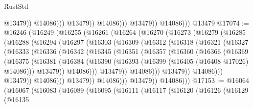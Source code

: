 \begin{lexlean}{RustStd}
\begin{coremodule}
                                  @13479))
                              @14086)))
                        @13479))
                    @14086)))
              @13479))
          @14086)))
    @13479
@17074 := @16246
    (@16249
      (@16255
        (@16261
          (@16264
            (@16270
              (@16273
                (@16279
                  (@16285
                    (@16288
                      (@16294
                        (@16297
                          (@16303
                            (@16309
                              (@16312
                                (@16318
                                  (@16321
                                    (@16327
                                      (@16333
                                        (@16336
                                          (@16342
                                            (@16345
                                              (@16351
                                                (@16357
                                                  (@16360
                                                    (@16366
                                                      (@16369
                                                        (@16375
                                                          (@16381
                                                            (@16384
                                                              (@16390
                                                                (@16393
                                                                  (@16399
                                                                    (@16405
                                                                      (@16408 @17026)
                                                                      @14086)))
                                                                @13479))
                                                            @14086)))
                                                      @13479))
                                                  @14086)))
                                            @13479))
                                        @14086)))
                                  @13479))
                              @14086)))
                        @13479))
                    @14086)))
              @13479))
          @14086)))
@17153 := @16064
    (@16067
      (@16083
        (@16089
          (@16095
            (@16111
              (@16117
                (@16120
                  (@16126
                    (@16129
                      (@16135

\end{coremodule}
\end{lexlean}

